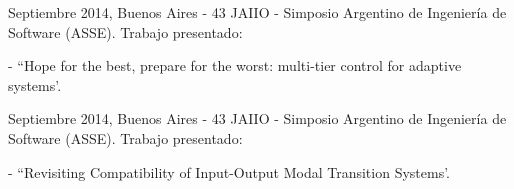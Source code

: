 \item Septiembre 2014, Buenos Aires - 43 JAIIO - Simposio Argentino de
Ingenier\'ia de Software (ASSE). Trabajo presentado:
\begin{compactitem}
\item[-] ``Hope for the best, prepare for the worst: multi-tier control for adaptive systems'.
\end{compactitem}

\item Septiembre 2014, Buenos Aires - 43 JAIIO - Simposio Argentino de
Ingenier\'ia de Software (ASSE). Trabajo presentado:
\begin{compactitem}
\item[-] ``Revisiting Compatibility of Input-Output Modal Transition Systems'.
\end{compactitem}



